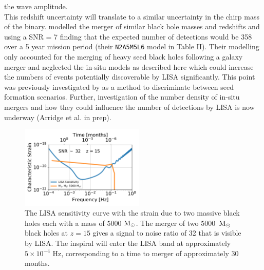 \documentclass[graphics, twocolumn, usenatbib]{mn2e}
\newcommand{\msolar} {$\rm{M_{\odot}}~$}
\newcommand{\msolarc} {$\rm{M_{\odot}}$}
\begin{document}
the wave amplitude. \\
\indent This redshift uncertainty will translate to a similar uncertainty in the chirp mass of the binary.
\cite{Klein_2016} modelled the merger of similar black hole masses and redshifts and using a
SNR = 7 finding that the expected number of detections would be 358 over a 5 year mission period
(their \texttt{N2A5M5L6} model in Table II). Their modelling only accounted for the merging of
heavy seed black holes following a galaxy merger and
neglected the in-situ models as described here which could increase the numbers of events potentially
discoverable by LISA significantly. This point was previously investigated by
\cite{Hartwig_2018} as a method to discriminate between seed formation scenarios. Further,
investigation of the number density of in-situ mergers and how they could influence the number
of detections by LISA is now underway (Arridge et al. in prep).


\begin{figure}
   \centering 
\includegraphics[width=0.525\textwidth]{FIGURES/Sensitivity.pdf}
\caption{The LISA sensitivity curve with the strain due to two massive black holes each with a mass
  of 5000 \msolarc. The merger of two 5000~\msolar black holes at $z = 15$ gives a
  signal to noise ratio of 32 that is visible by LISA. The inspiral will enter the LISA band at
  approximately $5 \times 10^{-4}$ Hz, corresponding to a time to merger of approximately 30 months.}
\label{Fig:Sensitivity}
\end{figure}
\end{document}
